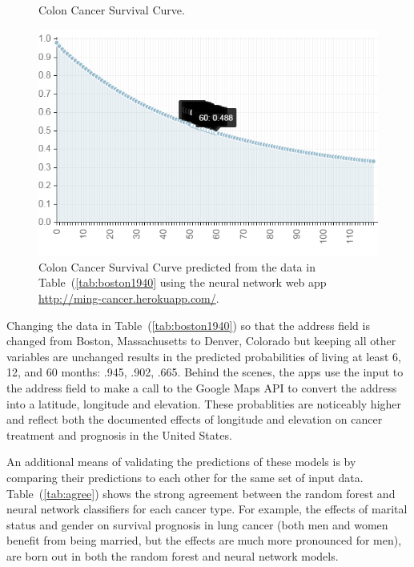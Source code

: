 \documentclass[a4paper,11pt]{article}
\begin{document}
\begin{figure}[!ht]
 \caption{Colon Cancer Survival Curve.}
  \label{fig:boston1940}
  \centering
    \includegraphics[scale=.5]{boston1940}
\caption{\label{fig:boston1940} Colon Cancer Survival Curve predicted from the data in 
Table~(\ref{tab:boston1940} using the neural network web app \url{http://ming-cancer.herokuapp.com/}.}
\end{figure}









Changing the data in Table~(\ref{tab:boston1940}) so that the address field is changed from Boston, Massachusetts to Denver, Colorado but keeping all other variables are unchanged results in the predicted probabilities of living at least 6, 12, and 60 months: .945, .902, .665. 
Behind the scenes, the apps use the input to the address field to make a call to the Google Maps API to convert the address into a latitude, longitude and elevation.
These probablities are noticeably higher and reflect both the documented effects of longitude and elevation on cancer treatment and prognosis in the United States.

An additional means of validating the predictions of these models is by comparing their predictions to each other for the same set of input data. 
Table~(\ref{tab:agree}) shows the strong agreement between the random forest and neural network classifiers for each cancer type. 
For example, the effects of marital status and gender on survival prognosis in lung cancer (both men and women benefit from being married, but the effects are much more pronounced for men), are born out in both the random forest and neural network models. 
\end{document}
